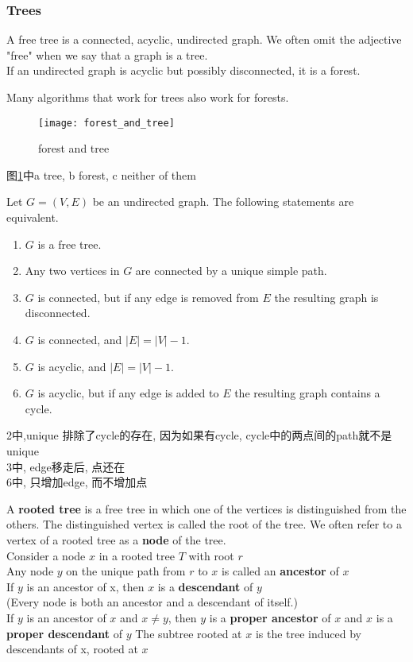 \documentclass{article}
\begin{document}
\subsubsection{Trees}
A free tree is a connected, acyclic, undirected graph. We often omit the adjective "free" when we say that a graph is a tree. \\
If an undirected graph is acyclic but possibly disconnected, it is a forest.

Many algorithms that work for trees also work for forests.

\begin{figure}[htbp]
  \centering
  \texttt{[image: forest\_and\_tree]}\\
  \caption{forest and tree}\label{fig.forest_and_tree}
\end{figure}

图\ref{fig.forest_and_tree}中a tree, b forest, c neither of them

\begin{theorem}
 Let $G = (V, E)$ be an undirected graph. The following statements are equivalent.
\begin{enumerate}
	\item $G$ is a free tree.
	\item Any two vertices in $G$ are connected by a unique simple path.
	\item $G$ is connected, but if any edge is removed from $E$ the resulting graph is disconnected.
	\item $G$ is connected, and $|E| = |V | - 1$.
	\item $G$ is acyclic, and $|E| = |V | - 1$.
	\item $G$ is acyclic, but if any edge is added to $E$ the resulting graph contains a cycle.
\end{enumerate}
\end{theorem}
\noindent
2中,unique 排除了cycle的存在, 因为如果有cycle, cycle中的两点间的path就不是unique\\
3中, edge移走后, 点还在\\
6中, 只增加edge, 而不增加点

\bigskip
A \textbf{rooted tree} is a free tree in which one of the vertices is distinguished from the others. The distinguished vertex is called the root of the tree. We often refer to a vertex of a rooted tree as a \textbf{node} of the tree.\\
Consider a node $x$ in a rooted tree $T$ with root $r$ \\
Any node $y$ on the unique path from $r$ to $x$ is called an \textbf{ancestor} of $x$ \\
If $y$ is an ancestor of x, then $x$ is a \textbf{descendant} of $y$ \\
(Every node is both an ancestor and a descendant of itself.) \\
If $y$ is an ancestor of $x$ and $x \neq y$, then $y$ is a \textbf{proper ancestor} of $x$ and $x$ is a \textbf{proper descendant} of $y$ The subtree rooted at $x$ is the tree induced by descendants of x, rooted at $x$
\end{document}
